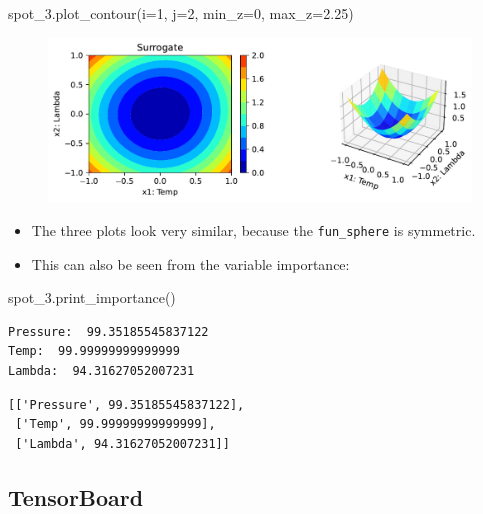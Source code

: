 \documentclass[
  letterpaper,
  DIV=11,
  numbers=noendperiod]{scrreprt}
\newenvironment{Shaded}{\begin{snugshade}}{\end{snugshade}}
\newcommand{\DecValTok}[1]{\textcolor[rgb]{0.68,0.00,0.00}{#1}}
\newcommand{\FloatTok}[1]{\textcolor[rgb]{0.68,0.00,0.00}{#1}}
\newcommand{\NormalTok}[1]{\textcolor[rgb]{0.00,0.23,0.31}{#1}}
\newcommand{\OperatorTok}[1]{\textcolor[rgb]{0.37,0.37,0.37}{#1}}
\providecommand{\tightlist}{%
  \setlength{\itemsep}{0pt}\setlength{\parskip}{0pt}}\usepackage{longtable,booktabs,array}
\begin{document}
\begin{Shaded}
\begin{Highlighting}[]
\NormalTok{spot\_3.plot\_contour(i}\OperatorTok{=}\DecValTok{1}\NormalTok{, j}\OperatorTok{=}\DecValTok{2}\NormalTok{, min\_z}\OperatorTok{=}\DecValTok{0}\NormalTok{, max\_z}\OperatorTok{=}\FloatTok{2.25}\NormalTok{)}
\end{Highlighting}
\end{Shaded}

\begin{figure}[H]

{\centering \includegraphics{02_spot_multidim_files/figure-pdf/cell-10-output-1.pdf}

}

\end{figure}

\begin{itemize}
\tightlist
\item
  The three plots look very similar, because the \texttt{fun\_sphere} is
  symmetric.
\item
  This can also be seen from the variable importance:
\end{itemize}

\begin{Shaded}
\begin{Highlighting}[]
\NormalTok{spot\_3.print\_importance()}
\end{Highlighting}
\end{Shaded}

\begin{verbatim}
Pressure:  99.35185545837122
Temp:  99.99999999999999
Lambda:  94.31627052007231
\end{verbatim}

\begin{verbatim}
[['Pressure', 99.35185545837122],
 ['Temp', 99.99999999999999],
 ['Lambda', 94.31627052007231]]
\end{verbatim}

\hypertarget{tensorboard-1}{%
\subsection{TensorBoard}\label{tensorboard-1}}
\end{document}
